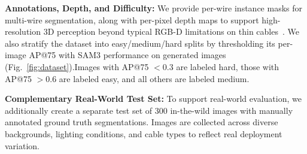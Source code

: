 \documentclass[letterpaper, 10 pt, conference]{ieeeconf}  %
\begin{document}
\noindent\textbf{Annotations, Depth, and Difficulty:}
We provide per-wire instance masks for multi-wire segmentation, along with per-pixel depth maps to support high-resolution 3D perception beyond typical RGB-D limitations on thin cables~\cite{trackDLO,depth_anything_3}. We also stratify the dataset into easy/medium/hard splits by thresholding its per-image AP@75 with SAM3 performance on generated images (Fig.~\ref{fig:dataset}).Images with AP@75 $< 0.3$ are labeled hard, those with AP@75 $> 0.6$ are labeled easy, and all others are labeled medium.




\noindent\textbf{Complementary Real-World Test Set:} To support real-world evaluation, we additionally create a separate test set of 300 in-the-wild images with manually annotated ground truth segmentations. Images are collected across diverse backgrounds, lighting conditions, and cable types to reflect real deployment variation.
\end{document}
